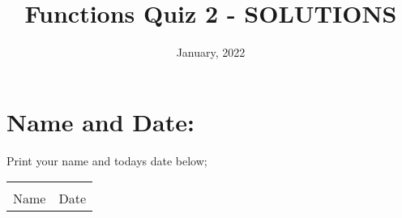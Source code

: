 \documentclass[12pt]{article} %
\title{Functions Quiz 2 - SOLUTIONS}
\date{January, 2022}
\begin{document}
    \renewcommand*{\coursecode}{MCR3U Quiz} %
    \renewcommand*{\assgnnumber}{2} %
    \renewcommand*{\submdate}{January, 2022} %
    \renewcommand*{\studentfname}{\textbf{Name:}} %
    \renewcommand*{\studentlname}{} %

    \renewcommand\qedsymbol{$\blacksquare$}
    \setfigpath
    \pagestyle{crowdmark}
    \fancyhfoffset[L,O]{0pt} %




	\maketitle
\section{Name and Date:}
	Print your name and todays date below;\\


	\begin{center}
	\noindent\begin{tabular}{ll}
		\makebox[3in]{\hrulefill} & \makebox[3in]{\hrulefill}\\
		Name & Date\\[8ex]%
	\end{tabular}
	\end{center}
	\newpage
\end{document}
